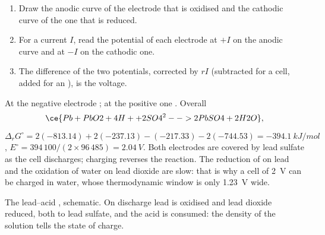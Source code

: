 \begin{method}\label{met:b2:batteries-electrolysis:operating-point}
\begin{enumerate}
  \item Draw the anodic curve of the electrode that is oxidised and the
        cathodic curve of the one that is reduced.
  \item For a current $I$, read the potential of each electrode at $+I$ on the
        anodic curve and at $-I$ on the cathodic one.
  \item The difference of the two potentials, corrected by $rI$ (subtracted for
        a cell, added for an ), is the voltage.
\end{enumerate}
\end{method}

\begin{example}\label{ex:b2:batteries-electrolysis:lead}
At the negative electrode ; at the positive one
. Overall
\[
  \ce{Pb + PbO2 + 4H+ + 2SO4^2- -> 2PbSO4 + 2H2O},
\]
$\Delta_r G^\circ = 2(-813.14) + 2(-237.13) - (-217.33) - 2(-744.53) =
\qty{-394.1}{kJ/mol}$, $E^\circ = 394\,100/(2 \times 96\,485) = \qty{2.04}{V}$.
Both electrodes are covered by lead sulfate as the cell discharges; charging
reverses the reaction. The reduction of  on lead and the oxidation of
water on lead dioxide are slow: that is why a cell of \qty{2}{V} can be charged
in water, whose thermodynamic window is only \qty{1.23}{V} wide.
\end{example}

\begin{omfigure}

{\small The lead--acid , schematic. On discharge lead is oxidised
and lead dioxide reduced, both to lead sulfate, and the acid is consumed: the
density of the solution tells the state of charge.}
\end{omfigure}


